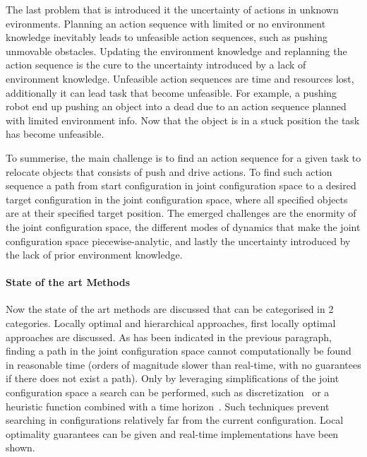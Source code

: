 The last problem that is introduced it the uncertainty of actions in unknown evironments. Planning an action sequence with limited or no environment knowledge inevitably leads to unfeasible action sequences, such as pushing unmovable obstacles. Updating the environment knowledge and replanning the action sequence is the cure to the uncertainty introduced by a lack of environment knowledge. Unfeasible action sequences are time and resources lost, additionally it can lead task that become unfeasible. For example, a pushing robot end up pushing an object into a dead due to an action sequence planned with limited environment info. Now that the object is in a stuck position the task has become unfeasible.\bs

To summerise, the main challenge is to find an action sequence for a given task to relocate objects that consists of push and drive actions. To find such action sequence a path from start configuration in joint configuration space to a desired target configuration in the joint configuration space, where all specified objects are at their specified target position. The emerged challenges are the enormity of the joint configuration space, the different modes of dynamics that make the joint configuration space piecewise-analytic, and lastly the uncertainty introduced by the lack of prior environment knowledge.\bs

\paragraph{State of the art Methods}
Now the state of the art methods are discussed that can be categorised in 2 categories. Locally optimal and hierarchical approaches, first locally optimal approaches are discussed. As has been indicated in the previous paragraph, finding a path in the joint configuration space cannot computationally be found in reasonable time (orders of magnitude slower than real-time, with no guarantees if there does not exist a path). Only by leveraging simplifications of the joint configuration space a search can be performed, such as discretization~\cite{sabbaghnovin_optimal_2016} or a heuristic function combined with a time horizon~\cite{sabbaghnovin_optimal_2016}. Such techniques prevent searching in configurations relatively far from the current configuration. Local optimality guarantees can be given and real-time implementations have been shown.\bs


